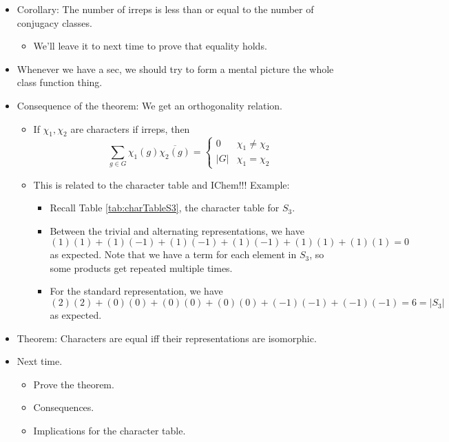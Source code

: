 \documentclass[../notes.tex]{subfiles}
\begin{document}
\begin{itemize}
    \item Corollary: The number of irreps is less than or equal to the number of conjugacy classes.
    \begin{itemize}
        \item We'll leave it to next time to prove that equality holds.
    \end{itemize}
    \item Whenever we have a sec, we should try to form a mental picture the whole class function thing.
    \item Consequence of the theorem: We get an orthogonality relation.
    \begin{itemize}
        \item If $\chi_1,\chi_2$ are characters if irreps, then
        \begin{equation*}
            \sum_{g\in G}\chi_1(g)\overline{\chi_2(g)} =
            \begin{cases}
                0 & \chi_1\neq\chi_2\\
                |G| & \chi_1=\chi_2
            \end{cases}
        \end{equation*}
        \item This is related to the character table and IChem!!! Example:
        \begin{itemize}
            \item Recall Table \ref{tab:charTableS3}, the character table for $S_3$.
            \item Between the trivial and alternating representations, we have
            \begin{equation*}
                (1)(1)+(1)(-1)+(1)(-1)+(1)(-1)+(1)(1)+(1)(1) = 0
            \end{equation*}
            as expected. Note that we have a term for each element in $S_3$, so some products get repeated multiple times.
            \item For the standard representation, we have
            \begin{equation*}
                (2)(2)+(0)(0)+(0)(0)+(0)(0)+(-1)(-1)+(-1)(-1) = 6 = |S_3|
            \end{equation*}
            as expected.
        \end{itemize}
    \end{itemize}
    \item Theorem: Characters are equal iff their representations are isomorphic.
    \item Next time.
    \begin{itemize}
        \item Prove the theorem.
        \item Consequences.
        \item Implications for the character table.
    \end{itemize}
\end{itemize}
\end{document}
